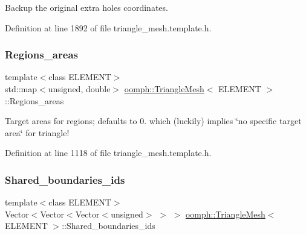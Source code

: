 Backup the original extra holes coordinates. 



Definition at line 1892 of file triangle\+\_\+mesh.\+template.\+h.

\mbox{\label{classoomph_1_1TriangleMesh_a26e357b1993ee77e390aa3b246c1e12b}} 
\subsubsection{\texorpdfstring{Regions\+\_\+areas}{Regions\_areas}}
{\footnotesize\ttfamily template$<$class E\+L\+E\+M\+E\+NT$>$ \\
std\+::map$<$unsigned, double$>$ \hyperlink{classoomph_1_1TriangleMesh}{oomph\+::\+Triangle\+Mesh}$<$ E\+L\+E\+M\+E\+NT $>$\+::Regions\+\_\+areas\hspace{0.3cm}{\ttfamily [protected]}}



Target areas for regions; defaults to 0. which (luckily) implies \char`\"{}no specific target area\char`\"{} for triangle! 



Definition at line 1118 of file triangle\+\_\+mesh.\+template.\+h.

\mbox{\label{classoomph_1_1TriangleMesh_a0a9ca3fff7a20de44410bb246becf0dc}} 
\subsubsection{\texorpdfstring{Shared\+\_\+boundaries\+\_\+ids}{Shared\_boundaries\_ids}}
{\footnotesize\ttfamily template$<$class E\+L\+E\+M\+E\+NT$>$ \\
Vector$<$Vector$<$Vector$<$unsigned$>$ $>$ $>$ \hyperlink{classoomph_1_1TriangleMesh}{oomph\+::\+Triangle\+Mesh}$<$ E\+L\+E\+M\+E\+NT $>$\+::Shared\+\_\+boundaries\+\_\+ids\hspace{0.3cm}{\ttfamily [protected]}}



